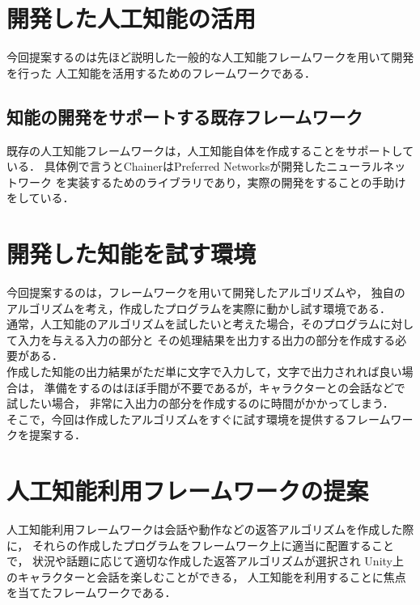 \section{開発した人工知能の活用}
今回提案するのは先ほど説明した一般的な人工知能フレームワークを用いて開発を行った
人工知能を活用するためのフレームワークである．\\
\subsection{知能の開発をサポートする既存フレームワーク}
既存の人工知能フレームワークは，人工知能自体を作成することをサポートしている．
具体例で言うとChainerはPreferred Networksが開発したニューラルネットワーク
を実装するためのライブラリであり，実際の開発をすることの手助けをしている．
\section{開発した知能を試す環境}
今回提案するのは，フレームワークを用いて開発したアルゴリズムや，
独自のアルゴリズムを考え，作成したプログラムを実際に動かし試す環境である．\\

通常，人工知能のアルゴリズムを試したいと考えた場合，そのプログラムに対して入力を与える入力の部分と
その処理結果を出力する出力の部分を作成する必要がある．\\

作成した知能の出力結果がただ単に文字で入力して，文字で出力されれば良い場合は，
準備をするのはほぼ手間が不要であるが，キャラクターとの会話などで試したい場合，
非常に入出力の部分を作成するのに時間がかかってしまう．\\

そこで，今回は作成したアルゴリズムをすぐに試す環境を提供するフレームワークを提案する．
\section{人工知能利用フレームワークの提案}
人工知能利用フレームワークは会話や動作などの返答アルゴリズムを作成した際に，
それらの作成したプログラムをフレームワーク上に適当に配置することで，
状況や話題に応じて適切な作成した返答アルゴリズムが選択され
Unity上のキャラクターと会話を楽しむことができる，
人工知能を利用することに焦点を当てたフレームワークである．
